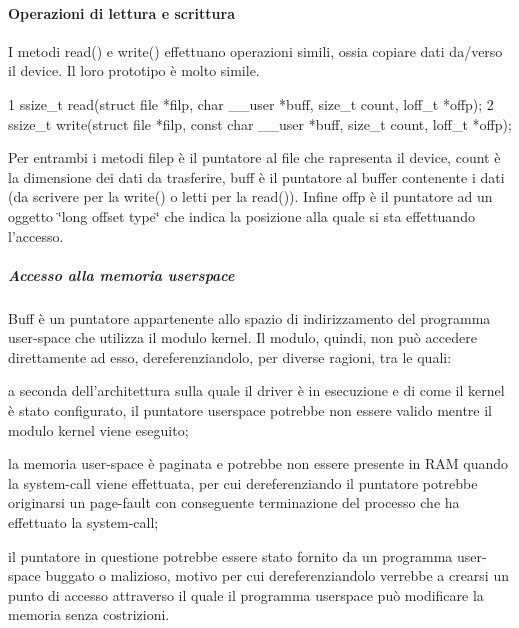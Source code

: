 \paragraph*{Operazioni di lettura e scrittura}

I metodi read() e write() effettuano operazioni simili, ossia copiare dati da/verso il device. Il loro prototipo è molto simile.


\begin{DoxyCode}
1 ssize\_t read(struct file *filp, char \_\_user *buff, size\_t count, loff\_t *offp);
2 ssize\_t write(struct file *filp, const char \_\_user *buff, size\_t count, loff\_t *offp);
\end{DoxyCode}


Per entrambi i metodi filep è il puntatore al file che rapresenta il device, count è la dimensione dei dati da trasferire, buff è il puntatore al buffer contenente i dati (da scrivere per la write() o letti per la read()). Infine offp è il puntatore ad un oggetto \char`\"{}long offset type\char`\"{} che indica la posizione alla quale si sta effettuando l'accesso. \subparagraph*{Accesso alla memoria userspace}

Buff è un puntatore appartenente allo spazio di indirizzamento del programma user-\/space che utilizza il modulo kernel. Il modulo, quindi, non può accedere direttamente ad esso, dereferenziandolo, per diverse ragioni, tra le quali\+:
\begin{DoxyItemize}
\item a seconda dell'architettura sulla quale il driver è in esecuzione e di come il kernel è stato configurato, il puntatore userspace potrebbe non essere valido mentre il modulo kernel viene eseguito;
\item la memoria user-\/space è paginata e potrebbe non essere presente in R\+A\+M quando la system-\/call viene effettuata, per cui dereferenziando il puntatore potrebbe originarsi un page-\/fault con conseguente terminazione del processo che ha effettuato la system-\/call;
\item il puntatore in questione potrebbe essere stato fornito da un programma user-\/space buggato o malizioso, motivo per cui dereferenziandolo verrebbe a crearsi un punto di accesso attraverso il quale il programma userspace può modificare la memoria senza costrizioni.
\end{DoxyItemize}

